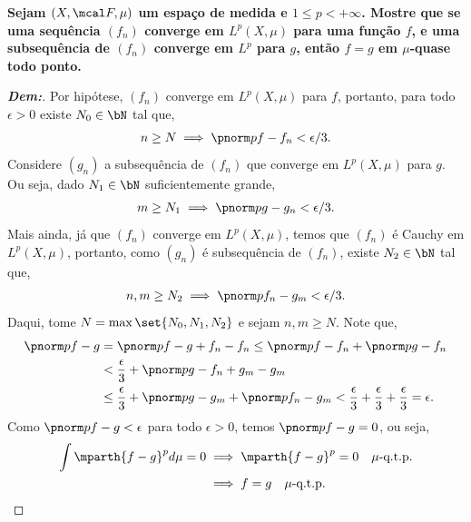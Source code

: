 \localtableofcontents
{}

\bigline
\textbf{Sejam $(X, \mcal F, \mu)$ um espaço de medida e $1 \le p < +\infty$. 
Mostre que se uma sequência $(f_n)$ converge em $L^p(X,\mu)$
para uma função $f$, e uma subsequência de $(f_n)$ converge em $L^p$ 
para $g$, então $f = g$ em $\mu$-quase todo ponto.}
\begin{proof}[\textbf{Dem:}] Por hipótese, $(f_n)$ converge em $L^p(X, \mu)$
para $f$, portanto, para todo $\epsilon > 0$ existe $N_0 \in \bN$ tal que, 
\begin{align*}
  n\ge N \implies \pnorm p {f - f_n} < \epsilon/3.
\end{align*}
Considere $(g_n)$ a subsequência de $(f_n)$ que converge em $L^p(X, \mu)$
para $g$. Ou seja, dado $N_1 \in \bN$ suficientemente grande, 
\begin{align*}
  m \ge N_1 \implies \pnorm p {g - g_n} < \epsilon/3.
\end{align*}
Mais ainda, já que $(f_n)$ converge em $L^p(X, \mu)$, temos que $(f_n)$
é Cauchy em $L^p(X, \mu)$, portanto, como $(g_n)$ é subsequência de $(f_n)$,
existe $N_2 \in \bN$ tal que,
\begin{align*}
  n, m \ge N_2 \implies \pnorm p {f_n - g_m} < \epsilon/3.
\end{align*}
Daqui, tome $N = \max\set{N_0, N_1, N_2}$ e sejam $n, m \ge N$. Note que, 
\begin{align*}
  \pnorm p {f - g} &= \pnorm p {f - g + f_n - f_n} 
  \le \pnorm p {f - f_n} + \pnorm p {g - f_n}\\
  &< \frac{\epsilon}{3} + \pnorm p {g - f_n + g_m - g_m}\\
  &\le \frac{\epsilon}{3} + \pnorm p {g - g_m} + \pnorm p {f_n - g_m} 
  < \frac{\epsilon}{3} + \frac{\epsilon}{3} + \frac{\epsilon}{3} = \epsilon.
\end{align*}
Como $\pnorm p {f - g} < \epsilon$ para todo $\epsilon > 0$, temos $\pnorm p {f - g} = 0$,
ou seja,
\begin{align*}
  \int \mparth{f - g}^p d\mu = 0 &\implies \mparth{f - g}^p = 0 \quad \mu\text{-q.t.p.}\\
  &\implies f = g \quad \mu\text{-q.t.p.}
\end{align*}
\end{proof}

